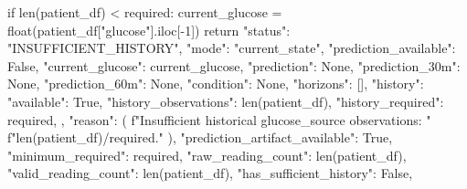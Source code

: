 if len(patient_df) < required:
    current_glucose = float(patient_df["glucose"].iloc[-1])
    return {
        "status": "INSUFFICIENT_HISTORY",
        "mode": "current_state",
        "prediction_available": False,
        "current_glucose": current_glucose,
        "prediction": None,
        "prediction_30m": None,
        "prediction_60m": None,
        "condition": None,
        "horizons": [],
        "history": {
            "available": True,
            "history_observations": len(patient_df),
            "history_required": required,
        },
        "reason": (
            f"Insufficient historical {glucose_source} observations: "
            f"{len(patient_df)}/{required}."
        ),
        "prediction_artifact_available": True,
        "minimum_required": required,
        "raw_reading_count": len(patient_df),
        "valid_reading_count": len(patient_df),
        "has_sufficient_history": False,
    }

